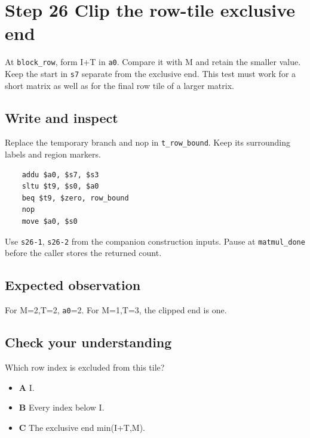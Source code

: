 \section{Step 26 Clip the row-tile exclusive end}\label{matmul-s26}

At \texttt{block\_row}, form I+T in \texttt{a0}. Compare it with M and retain the smaller value. Keep the start in \texttt{s7} separate from the exclusive end. This test must work for a short matrix as well as for the final row tile of a larger matrix.

\subsection{Write and inspect}
Replace the temporary branch and nop in \texttt{t\_row\_bound}. Keep its surrounding labels and region markers.

\begin{verbatim}
    addu $a0, $s7, $s3
    sltu $t9, $s0, $a0
    beq $t9, $zero, row_bound
    nop
    move $a0, $s0
\end{verbatim}
Use \texttt{s26-1}, \texttt{s26-2} from the companion construction inputs. Pause at \texttt{matmul\_done} before the caller stores the returned count.

\subsection{Expected observation}
For M=2,T=2, \texttt{a0}=2. For M=1,T=3, the clipped end is one.

\subsection{Check your understanding}
Which row index is excluded from this tile?

\begin{itemize}
\item \textbf{A} I.
\item \textbf{B} Every index below I.
\item \textbf{C} The exclusive end min(I+T,M).
\end{itemize}
